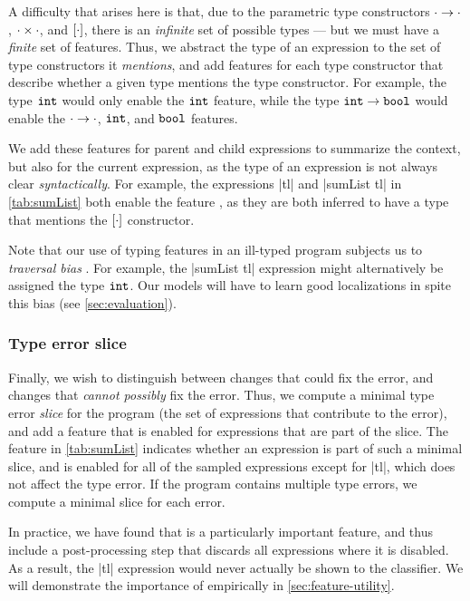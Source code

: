 A difficulty that arises here is that, due to the parametric type
constructors $\cdot \to \cdot$, $\cdot \times \cdot$, and
$[\cdot]$, there is an \emph{infinite} set of possible types ---
but we must have a \emph{finite} set of features.
%
Thus, we abstract the type of an expression to the set of type
constructors it \emph{mentions}, and add features for each type
constructor that describe whether a given type mentions the type
constructor.
%
For example, the type $\mathtt{int}$ would only enable the $\mathtt{int}$ feature,
while the type $\mathtt{int} \to \mathtt{bool}$ would enable the
$\cdot \to \cdot$, $\mathtt{int}$, and $\mathtt{bool}$ features.

We add these features for parent and child expressions to summarize the
context, but also for the current expression, as the type of an
expression is not always clear \emph{syntactically}.
%
For example, the expressions |tl| and |sumList tl|
in \autoref{tab:sumList} both enable the feature \HasTypeList, as they
are both inferred to have a type that mentions the $[\cdot]$
constructor.

Note that our use of typing features in an ill-typed program subjects us
to \emph{traversal bias} \citep{McAdam1998-ub}. For example, the
|sumList tl| expression might alternatively be assigned the type
$\mathtt{int}$.
%
Our models will have to learn good localizations in spite this bias (see
\autoref{sec:evaluation}).

\subsubsection{Type error slice}
Finally, we wish to distinguish between changes that could fix the
error, and changes that \emph{cannot possibly} fix the error.
%
Thus, we compute a minimal type error \emph{slice} for the program
(\ie the set of expressions that contribute to the error), and add a
feature that is enabled for expressions that are part of the slice.
%
The \InSlice feature in \autoref{tab:sumList} indicates whether an
expression is part of such a minimal slice, and is enabled for all of
the sampled expressions except for |tl|, which does not affect
the type error.
%
If the program contains multiple type errors, we compute
a minimal slice for each error.

In practice, we have found that \InSlice is a particularly important
feature, and thus include a post-processing step that discards all
expressions where it is disabled.
%
As a result, the |tl| expression would never actually be shown to the
classifier.
%
 We will demonstrate the importance of \InSlice empirically in
\autoref{sec:feature-utility}.

